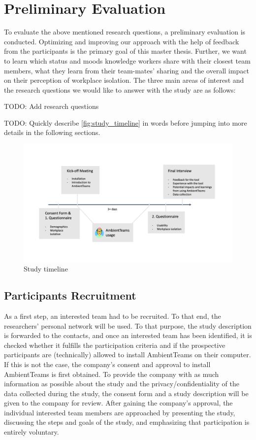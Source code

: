 \chapter{Preliminary Evaluation}
To evaluate the above mentioned research questions, a preliminary evaluation is conducted. Optimizing and improving our approach with the help of feedback from the participants is the primary goal of this master thesis. Further, we want to learn which status and moods knowledge workers share with their closest team members, what they learn from their team-mates' sharing and the overall impact on their perception of workplace isolation. The three main areas of interest and the research questions we would like to answer with the study are as follows:

TODO: Add research questions

TODO: Quickly describe \autoref{fig:study_timeline} in words before jumping into more details in the following sections.

\begin{figure}[h]
    \centering
    \includegraphics[width=.8\linewidth]{./images/Study_Timeline.png}
    \caption{Study timeline}
    \label{fig:study_timeline}
\end{figure}

\section{Participants Recruitment}
\label{section:recruitment}
As a first step, an interested team had to be recruited. To that end, the researchers' personal network will be used. To that purpose, the study description is forwarded to the contacts, and once an interested team has been identified, it is checked whether it fulfills the participation criteria and if the prospective participants are (technically) allowed to install AmbientTeams on their computer. If this is not the case, the company's consent and approval to install AmbientTeams is first obtained. To provide the company with as much information as possible about the study and the privacy/confidentiality of the data collected during the study, the consent form and a study description will be given to the company for review. After gaining the company's approval, the individual interested team members are approached by presenting the study, discussing the steps and goals of the study, and emphasizing that participation is entirely voluntary.

